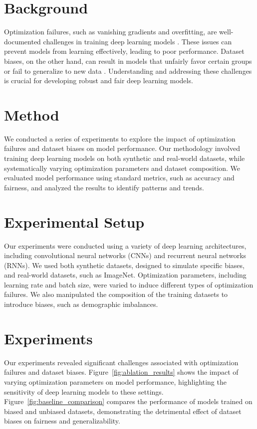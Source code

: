 \documentclass{article} %
\theoremstyle{plain}
\theoremstyle{definition}
\theoremstyle{remark}
\begin{document}
\section{Background}
\label{sec:background}
Optimization failures, such as vanishing gradients and overfitting, are well-documented challenges in training deep learning models \citep{cai2018and}. These issues can prevent models from learning effectively, leading to poor performance. Dataset biases, on the other hand, can result in models that unfairly favor certain groups or fail to generalize to new data \citep{gitonga2025mitigatingdb}. Understanding and addressing these challenges is crucial for developing robust and fair deep learning models.

\section{Method}
\label{sec:method}
We conducted a series of experiments to explore the impact of optimization failures and dataset biases on model performance. Our methodology involved training deep learning models on both synthetic and real-world datasets, while systematically varying optimization parameters and dataset composition. We evaluated model performance using standard metrics, such as accuracy and fairness, and analyzed the results to identify patterns and trends.

\section{Experimental Setup}
\label{sec:experimental_setup}
Our experiments were conducted using a variety of deep learning architectures, including convolutional neural networks (CNNs) and recurrent neural networks (RNNs). We used both synthetic datasets, designed to simulate specific biases, and real-world datasets, such as ImageNet. Optimization parameters, including learning rate and batch size, were varied to induce different types of optimization failures. We also manipulated the composition of the training datasets to introduce biases, such as demographic imbalances.

\section{Experiments}
\label{sec:experiments}
Our experiments revealed significant challenges associated with optimization failures and dataset biases. Figure~\ref{fig:ablation_results} shows the impact of varying optimization parameters on model performance, highlighting the sensitivity of deep learning models to these settings. Figure~\ref{fig:baseline_comparison} compares the performance of models trained on biased and unbiased datasets, demonstrating the detrimental effect of dataset biases on fairness and generalizability.
\end{document}
